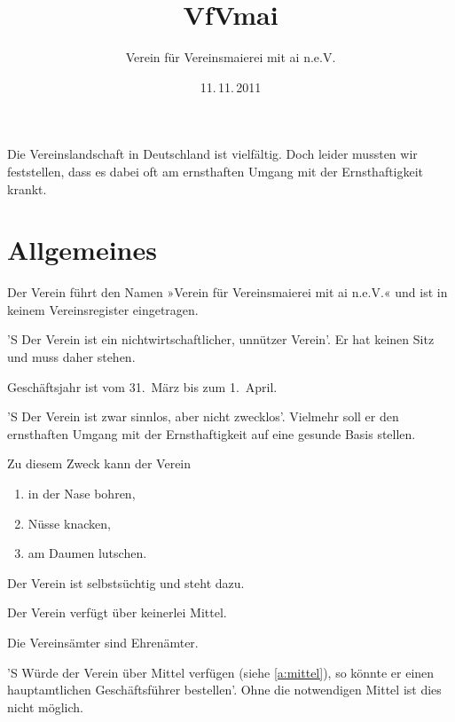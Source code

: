 \documentclass[fontsize=12pt,parskip=half]
              {scrartcl}
\begin{document}
\subject{Satzung}
\title{VfVmai}
\subtitle{Verein für Vereinsmaierei mit ai n.e.V.}
\date{11.\,11.\,2011}
\maketitle

\tableofcontents


Die Vereinslandschaft in Deutschland ist vielfältig.
Doch leider mussten wir feststellen, dass es dabei oft
am ernsthaften Umgang mit der Ernsthaftigkeit krankt.

\appendix

\section{Allgemeines}

\begin{contract}

Der Verein führt den Namen »Verein für Vereinsmaierei mit 
ai n.e.V.« und ist in keinem Vereinsregister eingetragen.

'S Der Verein ist ein nichtwirtschaftlicher, unnützer
Verein'. Er hat keinen Sitz und muss daher stehen.

Geschäftsjahr ist vom 31.~März bis zum 1.~April.


'S Der Verein ist zwar sinnlos, aber nicht zwecklos'.
Vielmehr soll er den ernsthaften Umgang mit der
Ernsthaftigkeit auf eine gesunde Basis stellen.

Zu diesem Zweck kann der Verein
\begin{enumerate}[\qquad a)]
\item in der Nase bohren,
\item Nüsse knacken,
\item am Daumen lutschen.
\end{enumerate}

Der Verein ist selbstsüchtig und steht dazu.

Der Verein verfügt über keinerlei Mittel.\label{a:mittel}


Die Vereinsämter sind Ehrenämter.

'S Würde der Verein über Mittel verfügen 
(siehe \ref{a:mittel}), so könnte er einen
hauptamtlichen Geschäftsführer bestellen'. Ohne
die notwendigen Mittel ist dies nicht möglich.

\label{p.maier}
\end{contract}
\end{document}
